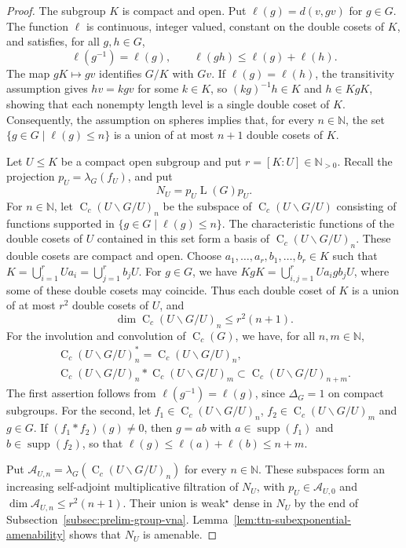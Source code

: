 \documentclass[11pt]{amsart}
\numberwithin{equation}{section}
\newcommand{\nn}{\mathbb N}
\newcommand{\A}{\mathcal A}
\DeclareMathOperator{\LL}{L}
\DeclareMathOperator{\supp}{supp}
\newcommand{\rC}{\operatorname{C}}
\newcommand{\Hk}[2]{\rC_c(#2\backslash #1/#2)}
\theoremstyle{definition}
\begin{document}
\begin{proof}
    The subgroup $K$ is compact and open. Put $\ell(g)=d(v,gv)$ for $g\in G$. The function $\ell$ is continuous, integer valued, constant on the double cosets of $K$, and satisfies, for all $g,h\in G$,
    $$
        \ell(g^{-1})=\ell(g),\qquad\ell(gh)\leq\ell(g)+\ell(h).
    $$
    The map $gK\mapsto gv$ identifies $G/K$ with $Gv$. If $\ell(g)=\ell(h)$, the transitivity assumption gives $hv=kgv$ for some $k\in K$, so $(kg)^{-1}h\in K$ and $h\in KgK$, showing that each nonempty length level is a single double coset of $K$. Consequently, the assumption on spheres implies that, for every $n\in\nn$, the set $\{g\in G\mid\ell(g)\leq n\}$ is a union of at most $n+1$ double cosets of $K$.

    Let $U\leq K$ be a compact open subgroup and put $r=[K:U]\in\nn_{>0}$. Recall the projection $p_U=\lambda_G(f_U)$, and put
    $$
        N_U=p_U\LL(G)p_U.
    $$
    For $n\in\nn$, let $\Hk GU_n$ be the subspace of $\Hk GU$ consisting of functions supported in $\{g\in G\mid\ell(g)\leq n\}$. The characteristic functions of the double cosets of $U$ contained in this set form a basis of $\Hk GU_n$. These double cosets are compact and open. Choose $a_1,\ldots,a_r,b_1,\ldots,b_r\in K$ such that $K=\bigcup_{i=1}^rUa_i=\bigcup_{j=1}^rb_jU$. For $g\in G$, we have $KgK=\bigcup_{i,j=1}^rUa_igb_jU$, where some of these double cosets may coincide. Thus each double coset of $K$ is a union of at most $r^2$ double cosets of $U$, and
    $$
        \dim\Hk GU_n\leq r^2(n+1).
    $$
    For the involution and convolution of $\rC_c(G)$, we have, for all $n,m\in\nn$,
    $$
    \begin{gathered}
        \Hk GU_n^*=\Hk GU_n,\\
        \Hk GU_n\ast\Hk GU_m\subset\Hk GU_{n+m}.
    \end{gathered}
    $$
    The first assertion follows from $\ell(g^{-1})=\ell(g)$, since $\Delta_G=1$ on compact subgroups. For the second, let $f_1\in\Hk GU_n$, $f_2\in\Hk GU_m$ and $g\in G$. If $(f_1\ast f_2)(g)\ne0$, then $g=ab$ with $a\in\supp(f_1)$ and $b\in\supp(f_2)$, so that $\ell(g)\leq\ell(a)+\ell(b)\leq n+m$.

    Put $\A_{U,n}=\lambda_G(\Hk GU_n)$ for every $n\in\nn$. These subspaces form an increasing self-adjoint multiplicative filtration of $N_U$, with $p_U\in\A_{U,0}$ and $\dim\A_{U,n}\leq r^2(n+1)$. Their union is weak$^\star$ dense in $N_U$ by the end of Subsection~\ref{subsec:prelim-group-vna}. Lemma~\ref{lem:ttn-subexponential-amenability} shows that $N_U$ is amenable.


\end{proof}
\end{document}
